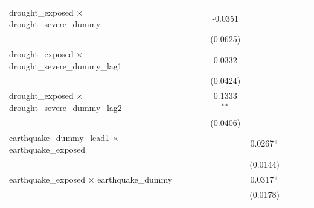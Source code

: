 \begin{tabular}{lcccccccc}
   drought\_exposed $\times$ drought\_severe\_dummy                   &                       &                       &                       & -0.0351               &                       &                       &                       &   \\   
                                                                      &                       &                       &                       & (0.0625)              &                       &                       &                       &   \\   
   drought\_exposed $\times$ drought\_severe\_dummy\_lag1             &                       &                       &                       & 0.0332                &                       &                       &                       &   \\   
                                                                      &                       &                       &                       & (0.0424)              &                       &                       &                       &   \\   
   drought\_exposed $\times$ drought\_severe\_dummy\_lag2             &                       &                       &                       & 0.1333$^{**}$         &                       &                       &                       &   \\   
                                                                      &                       &                       &                       & (0.0406)              &                       &                       &                       &   \\   
   earthquake\_dummy\_lead1 $\times$ earthquake\_exposed              &                       &                       &                       &                       & 0.0267$^{+}$          &                       &                       &   \\   
                                                                      &                       &                       &                       &                       & (0.0144)              &                       &                       &   \\   
   earthquake\_exposed $\times$ earthquake\_dummy                     &                       &                       &                       &                       & 0.0317$^{+}$          &                       &                       &   \\   
                                                                      &                       &                       &                       &                       & (0.0178)              &                       &                       &   \\   

\end{tabular}
